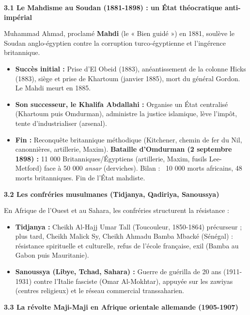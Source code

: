 \documentclass[11pt]{article}
\begin{document}
\textbf{3.1 Le Mahdisme au Soudan (1881-1898) : un État théocratique anti-impérial}

Muhammad Ahmad, proclamé \textbf{Mahdi} (le « Bien guidé ») en 1881, soulève le Soudan anglo-égyptien contre la corruption turco-égyptienne et l'ingérence britannique.
\begin{itemize}
    \item \textbf{Succès initial :} Prise d'El Obeid (1883), anéantissement de la colonne Hicks (1883), siège et prise de Khartoum (janvier 1885), mort du général Gordon. Le Mahdi meurt en 1885.
    \item \textbf{Son successeur, le Khalifa Abdallahi :} Organise un État centralisé (Khartoum puis Omdurman), administre la justice islamique, lève l'impôt, tente d'industrialiser (arsenal).
    \item \textbf{Fin :} Reconquête britannique méthodique (Kitchener, chemin de fer du Nil, canonnières, artillerie, Maxim). \textbf{Bataille d'Omdurman (2 septembre 1898) :} 11 000 Britanniques/Égyptiens (artillerie, Maxim, fusils Lee-Metford) face à 50 000 \emph{ansar} (derviches). Bilan : ~10 000 morts africains, 48 morts britanniques. Fin de l'État mahdiste.
\end{itemize}

\textbf{3.2 Les confréries musulmanes (Tidjanya, Qadiriya, Sanoussya)}

En Afrique de l'Ouest et au Sahara, les confréries structurent la résistance :
\begin{itemize}
    \item \textbf{Tidjanya :} Cheikh Al-Hajj Umar Tall (Toucouleur, 1850-1864) précurseur ; plus tard, Cheikh Malick Sy, Cheikh Ahmadu Bamba Mbacké (Sénégal) : résistance spirituelle et culturelle, refus de l'école française, exil (Bamba au Gabon puis Mauritanie).
    \item \textbf{Sanoussya (Libye, Tchad, Sahara) :} Guerre de guérilla de 20 ans (1911-1931) contre l'Italie fasciste (Omar Al-Mokhtar), appuyée sur les zawiyas (centres religieux) et le réseau commercial transsaharien.
\end{itemize}

\textbf{3.3 La révolte Maji-Maji en Afrique orientale allemande (1905-1907)}
\end{document}
